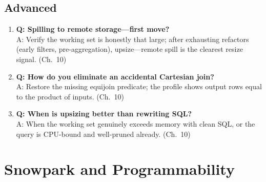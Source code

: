 \subsection{Advanced}
\begin{enumerate}
    \item \textbf{Q: Spilling to remote storage---first move?}\\
    A: Verify the working set is honestly that large; after exhausting refactors (early filters, pre-aggregation), upsize---remote spill is the clearest resize signal. (Ch.~10)
    \item \textbf{Q: How do you eliminate an accidental Cartesian join?}\\
    A: Restore the missing equijoin predicate; the profile shows output rows equal to the product of inputs. (Ch.~10)
    \item \textbf{Q: When is upsizing better than rewriting SQL?}\\
    A: When the working set genuinely exceeds memory with clean SQL, or the query is CPU-bound and well-pruned already. (Ch.~10)
\end{enumerate}

\section{Snowpark and Programmability}

